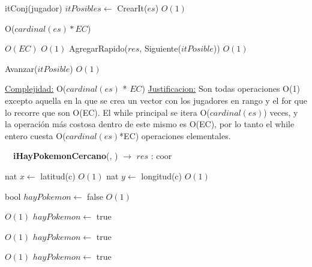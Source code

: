 \begin{Algoritmos}
\begin{algorithm}[H]
\begin{algorithmic}[1]
\State itConj(jugador) $itPosibles \gets$ CrearIt($es$) \Comment $O(1)$

   \Comment O($cardinal(es)*EC$)

     \Comment $O(EC)$
           \Comment $O(1)$
            \State AgregarRapido($res$, Siguiente($itPosible$))  \Comment $O(1)$    
        \EndIf
    \EndFor
    
    \State Avanzar($itPosible$)   \Comment $O(1)$
\EndWhile


\medskip
\State \underline{Complejidad:}  O($cardinal(es)$ * $EC$)
\State \underline{Justificacion:}  Son todas operaciones O(1) excepto aquella en la que se crea un vector con los jugadores en rango y el for que lo recorre que son O(EC). El while principal se itera O($cardinal(es)$) veces, y la operaci\'on m\'as costosa dentro de este mismo es O(EC), por lo tanto el while entero cuesta O($cardinal(es)$*EC) operaciones elementales.

\end{algorithmic}
\end{algorithm}



$ $\newline
$ $\newline
$ $\newline
{\textbf{iHayPokemonCercano}(, ) $\to$ $res$ : coor}
\begin{algorithmic}[1]

\State nat $x \gets$ latitud(c)    \Comment $O(1)$
\State nat $y \gets$ longitud(c)   \Comment $O(1)$


\State bool $hayPokemon \gets$ false    \Comment $O(1)$

     \Comment $O(1)$
    \State $hayPokemon \gets$ true
\EndIf

         \Comment $O(1)$
        \State $hayPokemon \gets$ true
    \EndIf


             \Comment $O(1)$
            \State $hayPokemon \gets$ true
        \EndIf

    \EndIf


\end{algorithmic}
\end{Algoritmos}
